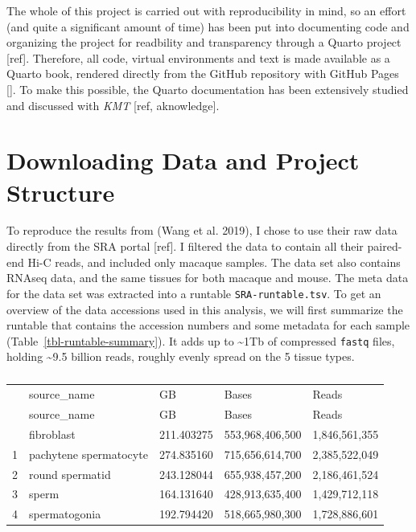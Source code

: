 \documentclass[
  a4paper,
]{scrbook}
\let\oldemph\emph
\renewcommand\emph[1]{\oldemph{\color{gray}#1}}
\begin{document}
The whole of this project is carried out with reproducibility in mind,
so an effort (and quite a significant amount of time) has been put into
documenting code and organizing the project for readbility and
transparency through a Quarto project {[}ref{]}. Therefore, all code,
virtual environments and text is made available as a Quarto book,
rendered directly from the GitHub repository with GitHub Pages {[}{]}.
To make this possible, the Quarto documentation has been extensively
studied and discussed with \emph{KMT} {[}ref, aknowledge{]}.

\section{Downloading Data and Project
Structure}\label{downloading-data-and-project-structure}

To reproduce the results from (Wang et al. 2019), I chose to use their
raw data directly from the SRA portal {[}ref{]}. I filtered the data to
contain all their paired-end Hi-C reads, and included only macaque
samples. The data set also contains RNAseq data, and the same tissues
for both macaque and mouse. The meta data for the data set was extracted
into a runtable \texttt{SRA-runtable.tsv}. To get an overview of the
data accessions used in this analysis, we will first summarize the
runtable that contains the accession numbers and some metadata for each
sample (Table~\ref{tbl-runtable-summary}). It adds up to
\textasciitilde1Tb of compressed \texttt{fastq} files, holding
\textasciitilde9.5 billion reads, roughly evenly spread on the 5 tissue
types.

\begin{longtable}[]{@{}lllll@{}}

\caption{\label{tbl-runtable-summary}Summary of the data accessions used
in this analysis}

\tabularnewline

\caption{}\label{T_55add}\tabularnewline
\toprule\noalign{}
~ & source\_name & GB & Bases & Reads \\
\midrule\noalign{}
\endfirsthead
\toprule\noalign{}
~ & source\_name & GB & Bases & Reads \\
\midrule\noalign{}
\endhead
\bottomrule\noalign{}
\endlastfoot
0 & fibroblast & 211.403275 & 553,968,406,500 & 1,846,561,355 \\
1 & pachytene spermatocyte & 274.835160 & 715,656,614,700 &
2,385,522,049 \\
2 & round spermatid & 243.128044 & 655,938,457,200 & 2,186,461,524 \\
3 & sperm & 164.131640 & 428,913,635,400 & 1,429,712,118 \\
4 & spermatogonia & 192.794420 & 518,665,980,300 & 1,728,886,601 \\

\end{longtable}
\end{document}
